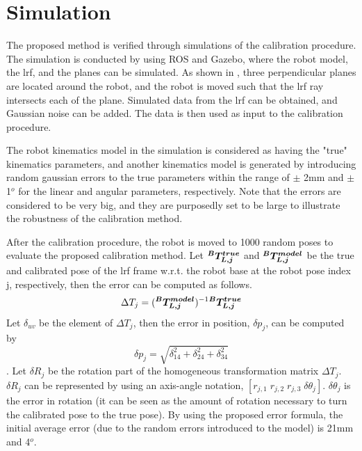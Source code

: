 \section{Simulation}
\label{sec:simulation}

The proposed method is verified through simulations of the calibration procedure. The simulation is conducted by using ROS and Gazebo, where the robot model, the \ac{lrf}, and the planes can be simulated.  
As shown in , three perpendicular planes are located around the robot, and the robot is moved such that the \ac{lrf} ray intersects each of the plane. Simulated data from the \ac{lrf} can be obtained, and Gaussian noise can be added. The data is then used as input to the calibration procedure. 

The robot kinematics model in the simulation is considered as having the "true" kinematics parameters, and another kinematics model is generated by introducing random gaussian errors to the true parameters within the range of $\pm$ 2mm and $\pm$ 1$^o$ for the linear and angular parameters, respectively. Note that the errors are considered to be very big, and they are purposedly set to be large to illustrate the robustness of the calibration method. 

After the calibration procedure, the robot is moved to 1000 random poses to evaluate the proposed calibration method. Let $\vb*{{^B}T_{L,j}^{true}}$ and $\vb*{{^B}T_{L,j}^{model}}$ be the true and calibrated pose of the \ac{lrf} frame w.r.t. the robot base at the robot pose index j, respectively, then the error can be computed as follows. 
\begin{equation}
\Delta T_j =  (\vb*{{^B}T_{L,j}^{model}})^{-1} \vb*{{^B}T_{L,j}^{true}}
\end{equation}
Let $\delta_{uv}$ be the element of $\Delta T_j$, then the error in position, $\delta p_j$, can be computed by
\begin{equation}
\delta p_j = \sqrt{\delta_{14}^2 + \delta_{24}^2 + \delta_{34}^2}
\end{equation}.
Let $\delta R_j$ be the rotation part of the homogeneous transformation matrix $\Delta T_j$. $\delta R_j$ can be represented by using an axis-angle notation, $[r_{j,1}\; r_{j,2}\; r_{j,3}\; \delta \theta_j]$. $\delta\theta_j$ is the error in rotation (it can be seen as the amount of rotation necessary to turn the calibrated pose to the true pose). 
By using the proposed error formula, the initial average error (due to the random errors introduced to the model) is 21mm and 4$^o$.



